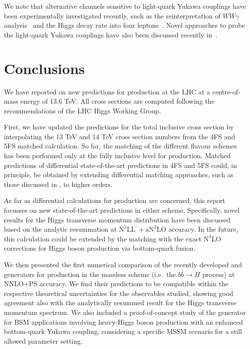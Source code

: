 \documentclass[11pt,a4paper]{article}
\begin{document}
We note that alternative channels sensitive to light-quark Yukawa couplings have been experimentally investigated recently, such as the reinterpretation of $WW\gamma$ analysis~\cite{CMS:2023rcv} and the Higgs decay rate into four leptons~\cite{CMS:2025xkn}. Novel approaches to probe the light-quark Yukawa couplings have also been discussed recently in~.

\section{Conclusions}\label{sec:conclusions}
We have reported on new predictions for \bbH{} production at the LHC at a centre-of-mass energy of 13.6 TeV. All cross sections are computed following the recommendations of the LHC Higgs Working Group.

First, we have updated the predictions for the 
total inclusive cross section by interpolating the 13 TeV and 14 TeV cross section
numbers from the 4FS and 5FS matched \nlonnllpart{} calculation. 
So far, the matching of the different flavour schemes has been performed 
only at the fully inclusive level for \bbH{} production.
Matched predictions of differential state-of-the-art \bbH{} 
predictions in 4FS and 5FS could, in principle, be obtained by 
extending differential matching approaches, such as those 
discussed in , to higher orders.

As far as differential calculations for \bbH{} production are concerned, 
this report focusses on new state-of-the-art predictions in either scheme.
Specifically, novel results for the Higgs transverse momentum distribution 
have been discussed based on the analytic resummation 
at $\text{N}^3\text{LL}^{\prime}+\text{aN}^3\text{LO}$ accuracy. 
In the future, this calculation could be extended by the matching with the 
exact $\text{N}^3\text{LO}$ corrections for Higgs boson production via 
bottom-quark fusion.

We then presented the first numerical comparison of the recently developed 
\minnlo{} and \GENEVA{} generators for \bbH{} production in the massless scheme
(i.e.\ the $b\bar b \to H$ process) at NNLO+PS accuracy. 
We find their predictions to be compatible within the respective theoretical uncertainties 
for the observables studied, showing good agreement also with the analytically resummed 
result for the Higgs transverse momentum spectrum. 
We also included a proof-of-concept study of the \minnlo{} generator for BSM 
applications involving heavy-Higgs boson production with an 
enhanced bottom-quark Yukawa coupling, considering a specific MSSM scenario
for a still allowed parameter setting.
\end{document}
